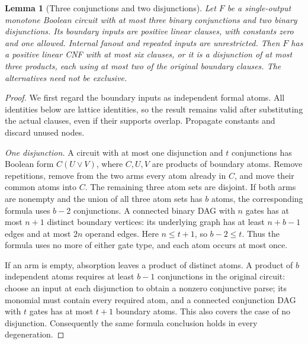 \documentclass[11pt]{article}
\newtheorem{lemma}[theorem]{Lemma}
\theoremstyle{definition}
\theoremstyle{remark}
\begin{document}
\begin{lemma}[Three conjunctions and two disjunctions]\label{lem:threeandtwoor}
Let $F$ be a single-output monotone Boolean circuit with at most three binary conjunctions and two binary disjunctions. Its boundary inputs are positive linear clauses, with constants zero and one allowed. Internal fanout and repeated inputs are unrestricted. Then $F$ has a positive linear CNF with at most six clauses, or it is a disjunction of at most three products, each using at most two of the original boundary clauses. The alternatives need not be exclusive.
\end{lemma}
\begin{proof}
We first regard the boundary inputs as independent formal atoms. All identities below are lattice identities, so the result remains valid after substituting the actual clauses, even if their supports overlap. Propagate constants and discard unused nodes.

\emph{One disjunction.} A circuit with at most one disjunction and $t$ conjunctions has Boolean form $C(U\vee V)$, where $C,U,V$ are products of boundary atoms. Remove repetitions, remove from the two arms every atom already in $C$, and move their common atoms into $C$. The remaining three atom sets are disjoint. If both arms are nonempty and the union of all three atom sets has $b$ atoms, the corresponding formula uses $b-2$ conjunctions. A connected binary DAG with $n$ gates has at most $n+1$ distinct boundary vertices: its underlying graph has at least $n+b-1$ edges and at most $2n$ operand edges. Here $n\le t+1$, so $b-2\le t$. Thus the formula uses no more of either gate type, and each atom occurs at most once.

If an arm is empty, absorption leaves a product of distinct atoms. A product of $b$ independent atoms requires at least $b-1$ conjunctions in the original circuit: choose an input at each disjunction to obtain a nonzero conjunctive parse; its monomial must contain every required atom, and a connected conjunction DAG with $t$ gates has at most $t+1$ boundary atoms. This also covers the case of no disjunction. Consequently the same formula conclusion holds in every degeneration.


\end{proof}
\end{document}
